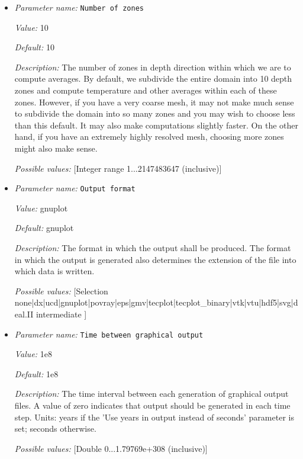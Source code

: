 \begin{itemize}
\item {\it Parameter name:} {\tt Number of zones}
\label{parameters:Postprocess/Depth average/Number of zones}


{\it Value:} 10


{\it Default:} 10


{\it Description:} The number of zones in depth direction within which we are to compute averages. By default, we subdivide the entire domain into 10 depth zones and compute temperature and other averages within each of these zones. However, if you have a very coarse mesh, it may not make much sense to subdivide the domain into so many zones and you may wish to choose less than this default. It may also make computations slightly faster. On the other hand, if you have an extremely highly resolved mesh, choosing more zones might also make sense.


{\it Possible values:} [Integer range 1...2147483647 (inclusive)]
\item {\it Parameter name:} {\tt Output format}
\label{parameters:Postprocess/Depth average/Output format}


{\it Value:} gnuplot


{\it Default:} gnuplot


{\it Description:} The format in which the output shall be produced. The format in which the output is generated also determines the extension of the file into which data is written.


{\it Possible values:} [Selection none|dx|ucd|gnuplot|povray|eps|gmv|tecplot|tecplot_binary|vtk|vtu|hdf5|svg|deal.II intermediate ]
\item {\it Parameter name:} {\tt Time between graphical output}
\label{parameters:Postprocess/Depth average/Time between graphical output}


{\it Value:} 1e8


{\it Default:} 1e8


{\it Description:} The time interval between each generation of graphical output files. A value of zero indicates that output should be generated in each time step. Units: years if the 'Use years in output instead of seconds' parameter is set; seconds otherwise.


{\it Possible values:} [Double 0...1.79769e+308 (inclusive)]
\end{itemize}

